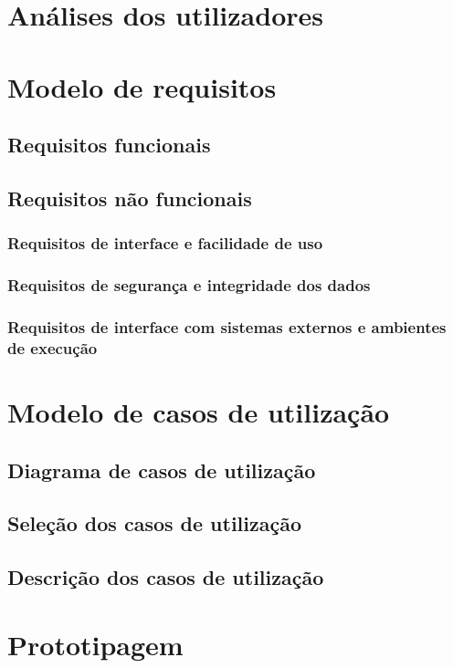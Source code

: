 \documentclass[11pt, twoside]{report}
\begin{document}
 	

	\chapter{Análises dos utilizadores}
	
	\chapter{Modelo de requisitos}
	\section{Requisitos funcionais}
	\section{Requisitos não funcionais}
	\subsection{Requisitos de interface e facilidade de uso}
	\subsection{Requisitos de segurança e integridade dos dados}
	\subsection{Requisitos de interface com sistemas externos e ambientes de execução}
	
	\chapter{Modelo de casos de utilização}
	\section{Diagrama de casos de utilização}
	\section{Seleção dos casos de utilização}
	\section{Descrição dos casos de utilização}
	
	\chapter{Prototipagem}
\end{document}
